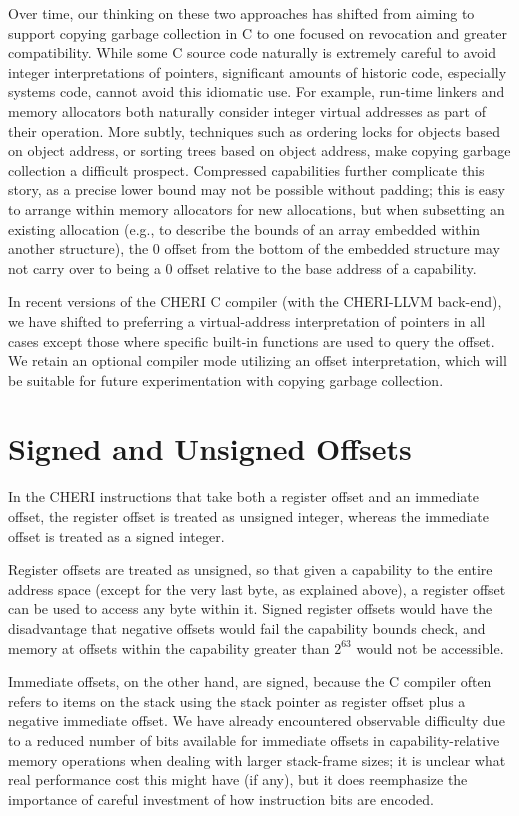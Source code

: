 Over time, our thinking on these two approaches has shifted from aiming to
support copying garbage collection in C to one focused on revocation and
greater compatibility.
While some C source code naturally is extremely careful to avoid integer
interpretations of pointers, significant amounts of historic code, especially
systems code, cannot avoid this idiomatic use.
For example, run-time linkers and memory allocators both naturally consider
integer virtual addresses as part of their operation.
More subtly, techniques such as ordering locks for objects based on object
address, or sorting trees based on object address, make copying garbage
collection a difficult prospect.
Compressed capabilities further complicate this story, as a precise lower
bound may not be possible without padding; this is easy to arrange within
memory allocators for new allocations, but when subsetting an existing
allocation (e.g., to describe the bounds of an array embedded within another
structure), the 0 offset from the bottom of the embedded structure may not
carry over to being a 0 offset relative to the base address of a capability.

In recent versions of the CHERI C compiler (with the CHERI-LLVM
back-end), we have shifted to preferring a virtual-address
interpretation of pointers in all cases except those where specific
built-in functions are used to query the offset.  We retain an
optional compiler mode utilizing an offset interpretation, which will
be suitable for future experimentation with copying garbage
collection.

\section{Signed and Unsigned Offsets}

In the CHERI instructions that take both a register offset and an immediate
offset, the register offset is treated as unsigned integer, whereas the
immediate offset is treated as a signed integer.

Register offsets are treated as unsigned, so that given a capability to
the entire address space (except for the very last byte, as
explained above), a register offset can be used to access any byte within it.
Signed register offsets would have the disadvantage that negative offsets
would fail the capability bounds check, and memory at offsets within the
capability greater than $2^{63}$ would not be accessible.

Immediate offsets, on the other hand, are signed, because the C compiler
often refers to items on the stack using the stack pointer as register
offset plus a negative immediate offset.
We have already encountered observable difficulty due to a reduced number of
bits available for immediate offsets in capability-relative memory operations
when dealing with larger stack-frame sizes; it is unclear what real
performance cost this might have (if any), but it does reemphasize the
importance of careful investment of how instruction bits are encoded.

